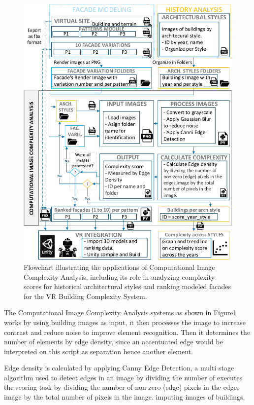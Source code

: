    \begin{figure}[!htb]
      \centering
      \includegraphics[width= \linewidth, trim=0 0 0 0, clip]{Images/ImageComplexityAnalysisFlowchart}
      \caption{Flowchart illustrating the applications of Computational Image Complexity Analysis, including its role in analyzing complexity scores for historical architectural styles and ranking modeled facades for the VR Building Complexity System.}
      \label{fig:ImageComplexityAnalysisFlowchart}
    \end{figure}

The Computational Image Complexity Analysis systems as shown in Figure\ref{fig:ImageComplexityAnalysisFlowchart} works by using building images as input, it then processes the image to increase contrast and reduce noise to improve element recognition.
Then it determines the number of elements by edge density, since an accentuated edge would be interpreted on this script as separation hence another element.

Edge density is calculated by applying Canny Edge Detection\cite{OpenCV2023}, a multi stage algorithm used to detect edges in an image by dividing the number of executes the scoring task by dividing the number of non-zero (edge) pixels in the edges image by the total number of pixels in the image. imputing images of buildings,